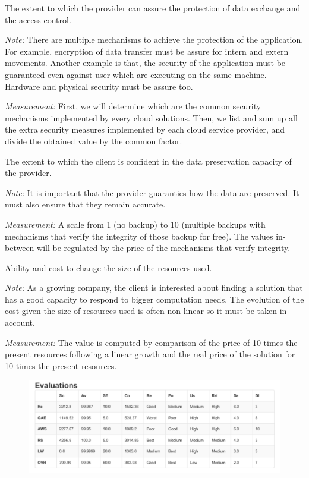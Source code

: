 \documentclass[a4paper,11pt]{article}
\begin{document}
\begin{description}[parsep=10pt,listparindent=\parindent,labelindent=\parindent,font=$\bullet$\ ]
  \item[Security:] The extent to which the provider can assure the protection of data exchange and the access control.
    \par \emph{Note:} There are multiple mechanisms to achieve the protection of the application. For example, encryption of data transfer must be assure for intern and extern movements. Another example is that, the security of the application must be guaranteed even against user which are executing on the same machine. Hardware and physical security must be assure too. 
    \par \emph{Measurement:} First, we will determine which are the common security mechanisms implemented by every cloud solutions. Then, we list and sum up all the extra security measures implemented by each cloud service provider, and divide the obtained value by the common factor.

  \item[Data Integrity:] The extent to which the client is confident in the data preservation capacity of the provider.
    \par \emph{Note:} It is important that the provider guaranties how the data are preserved. It must also ensure that they remain accurate.
    \par \emph{Measurement:} A scale from 1 (no backup) to 10 (multiple backups with mechanisms that verify the integrity of those backup for free). The values in-between will be regulated by the price of the mechanisms that verify integrity.

  \item[Scalability:] Ability and cost to change the size of the resources used.
    \par \emph{Note:} As a growing company, the client is interested about finding a solution that has a good capacity to respond to bigger computation needs. The evolution of the cost given the size of resources used is often non-linear so it must be taken in account.
    \par \emph{Measurement:} The value is computed by comparison of the price of 10 times the present resources following a linear growth and the real price of the solution for 10 times the present resources.

\end{description}

\begin{figure}[h]
  \center
  \includegraphics[width=\textwidth-2cm]{img/Result/evaluation.pdf}
\end{figure}
\end{document}
